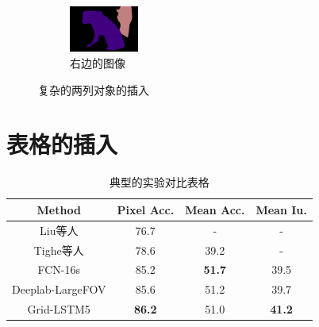 \begin{figure}[h!]
\begin{subfigure}{0.4\textwidth}
		\includegraphics[width=0.25\textwidth]{image/chap04/result/compare/my_dog.png} 
		\caption{右边的图像}
		\label{fig:compare2}
	\end{subfigure}
	\caption{复杂的两列对象的插入}
	\label{fig:complex}
\end{figure}


\clearpage

\section{表格的插入}

\begin{table}[h] %
	\centering
		\caption{典型的实验对比表格}
		\begin{tabular}{*{4}{c}}
			\toprule
	 		Method & Pixel Acc. & Mean Acc. & Mean Iu.\\
			\midrule
			Liu等人\cite{liu2011sift}  & 76.7 & - & -\\
		Tighe等人\cite{tighe2013finding}  & 78.6 & 39.2 & -\\
			FCN-16s\cite{long2015fully} & 85.2 & \textbf{51.7} & 39.5\\
			Deeplab-LargeFOV\cite{chen14semantic} & 85.6 & 51.2 & 39.7\\
			\midrule
			Grid-LSTM5 & \textbf{86.2} & 51.0 & \textbf{41.2}\\
			\bottomrule
		\end{tabular}
		\label{tab:siftflow}
\end{table}

